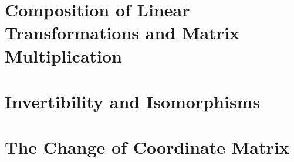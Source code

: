 \vspace{12pt}

\setcounter{Exercise}{7}


\vspace{12pt}

\setcounter{Exercise}{11}


\vspace{12pt}

\setcounter{Exercise}{15}



\section{Composition of Linear Transformations and Matrix
Multiplication}



\vspace{12pt}



\vspace{12pt}

\setcounter{Exercise}{11}


\vspace{12pt}




\section{Invertibility and Isomorphisms}



\vspace{12pt}



\vspace{12pt}



\vspace{12pt}

\setcounter{Exercise}{4}


\vspace{12pt}



\section{The Change of Coordinate Matrix}



\vspace{12pt}



\vspace{12pt}

\setcounter{Exercise}{6}

